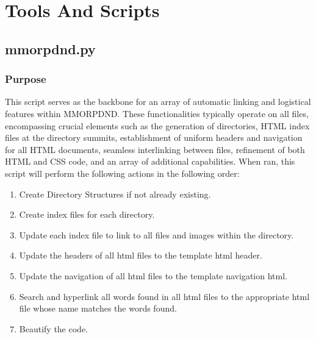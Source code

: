 \chapter{Tools And Scripts}


















\section{mmorpdnd.py}

\subsection{Purpose}

This script serves as the backbone for an array of automatic linking and logistical features within MMORPDND. These functionalities typically operate on all files, encompassing crucial elements such as the generation of directories, HTML index files at the directory summits, establishment of uniform headers and navigation for all HTML documents, seamless interlinking between files, refinement of both HTML and CSS code, and an array of additional capabilities. When ran, this script will perform the following actions in the following order:

\begin{enumerate}
	\item Create Directory Structures if not already existing.
	\item Create index files for each directory.
	\item Update each index file to link to all files and images within the directory.
	\item Update the headers of all html files to the template html header.
	\item Update the navigation of all html files to the template navigation html.
	\item Search and hyperlink all words found in all html files to the appropriate html file whose name matches the words found.
	\item Beautify the code.
\end{enumerate}







